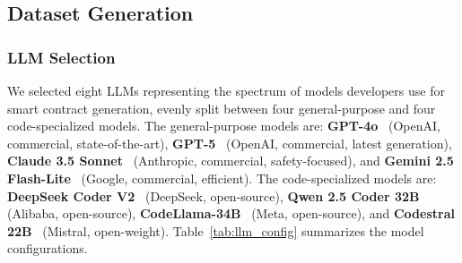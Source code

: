 \subsection{Dataset Generation}

\subsubsection{LLM Selection}
We selected eight LLMs representing the spectrum of models developers use for smart contract generation, evenly split between four general-purpose and four code-specialized models. The general-purpose models are: \textbf{GPT-4o}~\cite{openai_gpt4} (OpenAI, commercial, state-of-the-art), \textbf{GPT-5}~\cite{openai_gpt5} (OpenAI, commercial, latest generation), \textbf{Claude 3.5 Sonnet}~\cite{anthropic_claude} (Anthropic, commercial, safety-focused), and \textbf{Gemini 2.5 Flash-Lite}~\cite{gemini} (Google, commercial, efficient). The code-specialized models are: \textbf{DeepSeek Coder V2}~\cite{deepseek_coder} (DeepSeek, open-source), \textbf{Qwen 2.5 Coder 32B}~\cite{qwen_coder} (Alibaba, open-source), \textbf{CodeLlama-34B}~\cite{codellama} (Meta, open-source), and \textbf{Codestral 22B}~\cite{codestral} (Mistral, open-weight). Table~\ref{tab:llm_config} summarizes the model configurations.

\begin{table}[t]
\caption{LLM Configuration Details}
\label{tab:llm_config}
\centering
{}
\end{table}

